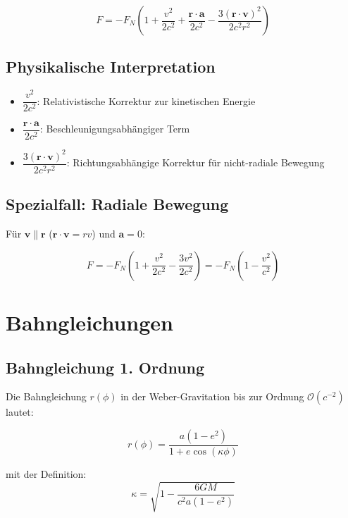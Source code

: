 \begin{equation}
    \boxed
    {
        F = -F_N \left(1 + \frac{v^2}{2c^2} + \frac{\mathbf{r}\cdot\mathbf{a}}{2c^2} - \frac{3(\mathbf{r}\cdot\mathbf{v})^2}{2c^2 r^2}\right)
    }
\end{equation}

\subsection{Physikalische Interpretation}

\begin{itemize}
\item $\dfrac{v^2}{2c^2}$: Relativistische Korrektur zur kinetischen Energie
\item $\dfrac{\mathbf{r}\cdot\mathbf{a}}{2c^2}$: Beschleunigungsabhängiger Term
\item $\dfrac{3(\mathbf{r}\cdot\mathbf{v})^2}{2c^2 r^2}$: Richtungsabhängige Korrektur für nicht-radiale Bewegung
\end{itemize}

\subsection{Spezialfall: Radiale Bewegung}

Für $\mathbf{v} \parallel \mathbf{r}$ ($\mathbf{r}\cdot\mathbf{v} = rv$) und $\mathbf{a} = 0$:

\begin{equation}
F = -F_N \left(1 + \frac{v^2}{2c^2} - \frac{3v^2}{2c^2}\right) = -F_N \left(1 - \frac{v^2}{c^2}\right)
\end{equation}

\section{Bahngleichungen}
\subsection{Bahngleichung 1. Ordnung}
Die Bahngleichung \(r(\phi)\) in der Weber-Gravitation bis zur Ordnung \(\mathcal{O}(c^{-2})\) lautet:

\begin{equation}
\label{eq:bahngleichung_1_ordnung}
\boxed
{
    r(\phi) = \frac{a(1 - e^2)}{1 + e \cos\left(\kappa\phi\right)}
}
\end{equation}

\noindent mit der Definition:
\begin{equation}
\label{eq:kappa_1_ordnung}
\boxed
{
    \kappa = \sqrt{1 - \frac{6GM}{c^2a(1 - e^2)}}    
}
\end{equation}

